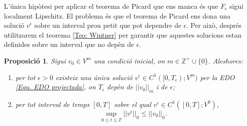 \documentclass{article}
\numberwithin{equation}{section}
\newtheorem{proposicio}{Proposici\'{o}}[section]
\begin{document}
L'\'{u}nica hip\`{o}tesi per aplicar el teorema de Picard que ens manca \'{e}s que $F_{\epsilon}$ sigui localment Lipschitz. El problema \'{e}s que el teorema de Picard ens dona una soluci\'{o} $v^{\epsilon}$ sobre un interval prou petit que pot dependre de $\epsilon$. Per aix\`{o}, despr\'{e}s utilitzarem el teorema \ref{Teo: Wintner} per garantir que aquestes solucions estan definides sobre un interval que no dep\`{e}n de $\epsilon$.

\begin{proposicio}\label{Pro: existencia suavitzada}
Sigui $v_0\in V^m$ una condici\'{o} inicial, on $m\in\mathbb{Z}^+\cup\{0\}$. Aleshores:
\begin{enumerate}
\item\label{Pro: existencia suavitzada 1} per tot $\epsilon>0$ existeix una \'{u}nica soluci\'{o} $v^{\epsilon}\in C^1([0,T_{\epsilon});V^m)$ per la EDO \eqref{Equ. EDO projectada}, on $T_{\epsilon}$ dep\`{e}n de $||v_0||_m$ i de $\epsilon$;
\item per tot interval de temps $[0,T]$ sobre el qual $v^{\epsilon}\in C^1([0,T];V^0)$,
\begin{equation}\label{Equ. fita energia}
\sup_{0\leq t\leq T}||v^{\epsilon}||_0\leq||v_0||_0.
\end{equation}
\end{enumerate}
\end{proposicio}
\end{document}
